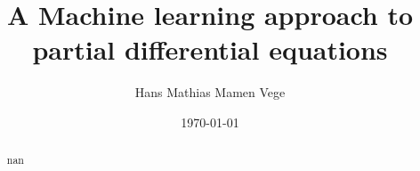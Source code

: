 \documentclass[11pt]{article}
\title{A Machine learning approach to partial differential equations}
\author{Hans Mathias Mamen Vege}
\date{\today}
\begin{document}
\maketitle

\begin{abstract}
nan
\end{abstract}



















\end{document}
